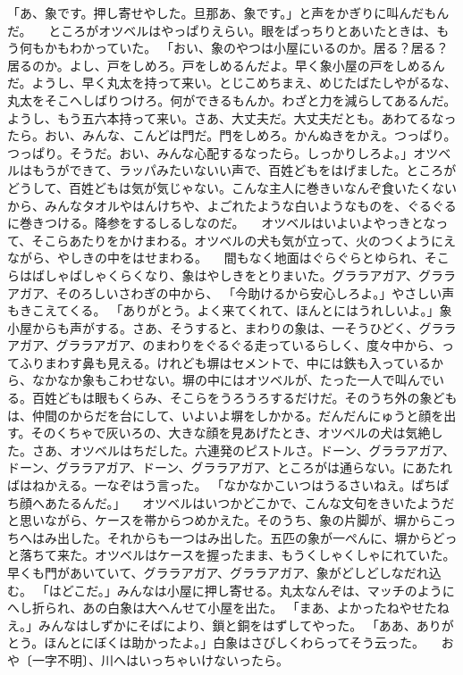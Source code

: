 「あ、象です。押し寄せやした。旦那あ、象です。」と声をかぎりに叫んだもんだ。
　ところがオツベルはやっぱりえらい。眼をぱっちりとあいたときは、もう何もかもわかっていた。
「おい、象のやつは小屋にいるのか。居る？{}居る？{}居るのか。よし、戸をしめろ。戸をしめるんだよ。早く象小屋の戸をしめるんだ。ようし、早く丸太を持って来い。とじこめちまえ、めじたばたしやがるな、丸太をそこへしばりつけろ。何ができるもんか。わざと力を減らしてあるんだ。ようし、もう五六本持って来い。さあ、大丈夫だ。大丈夫だとも。あわてるなったら。おい、みんな、こんどは門だ。門をしめろ。かんぬきをかえ。つっぱり。つっぱり。そうだ。おい、みんな心配するなったら。しっかりしろよ。」オツベルはもうができて、ラッパみたいないい声で、百姓どもをはげました。ところがどうして、百姓どもは気が気じゃない。こんな主人に巻きいなんぞ食いたくないから、みんなタオルやはんけちや、よごれたような白いようなものを、ぐるぐるに巻きつける。降参をするしるしなのだ。
　オツベルはいよいよやっきとなって、そこらあたりをかけまわる。オツベルの犬も気が立って、火のつくようにえながら、やしきの中をはせまわる。
　間もなく地面はぐらぐらとゆられ、そこらはばしゃばしゃくらくなり、象はやしきをとりまいた。グララアガア、グララアガア、そのろしいさわぎの中から、
「今助けるから安心しろよ。」やさしい声もきこえてくる。
「ありがとう。よく来てくれて、ほんとにはうれしいよ。」象小屋からも声がする。さあ、そうすると、まわりの象は、一そうひどく、グララアガア、グララアガア、のまわりをぐるぐる走っているらしく、度々中から、ってふりまわす鼻も見える。けれども塀はセメントで、中には鉄も入っているから、なかなか象もこわせない。塀の中にはオツベルが、たった一人で叫んでいる。百姓どもは眼もくらみ、そこらをうろうろするだけだ。そのうち外の象どもは、仲間のからだを台にして、いよいよ塀をしかかる。だんだんにゅうと顔を出す。そのくちゃで灰いろの、大きな顔を見あげたとき、オツベルの犬は気絶した。さあ、オツベルはちだした。六連発のピストルさ。ドーン、グララアガア、ドーン、グララアガア、ドーン、グララアガア、ところがは通らない。にあたればはねかえる。一なぞはう言った。
「なかなかこいつはうるさいねえ。ぱちぱち顔へあたるんだ。」
　オツベルはいつかどこかで、こんな文句をきいたようだと思いながら、ケースを帯からつめかえた。そのうち、象の片脚が、塀からこっちへはみ出した。それからも一つはみ出した。五匹の象が一ぺんに、塀からどっと落ちて来た。オツベルはケースを握ったまま、もうくしゃくしゃにれていた。早くも門があいていて、グララアガア、グララアガア、象がどしどしなだれ込む。
「はどこだ。」みんなは小屋に押し寄せる。丸太なんぞは、マッチのようにへし折られ、あの白象は大へんせて小屋を出た。
「まあ、よかったねやせたねえ。」みんなはしずかにそばにより、鎖と銅をはずしてやった。
「ああ、ありがとう。ほんとにぼくは助かったよ。」白象はさびしくわらってそう云った。
　おや〔一字不明〕、川へはいっちゃいけないったら。
　
　
　
